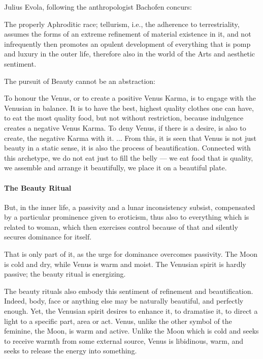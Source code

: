 Julius Evola, following the anthropologist Bachofen concurs:

\begin{quotex}
The properly Aphroditic race; tellurism, i.e., the adherence to terrestriality, assumes the forms of an extreme refinement of material existence in it, and not infrequently then promotes an opulent development of everything that is pomp and luxury in the outer life, therefore also in the world of the Arts and aesthetic sentiment.
\end{quotex}


The pursuit of Beauty cannot be an abstraction:

\begin{quotex}
To honour the Venus, or to create a positive Venus Karma, is to engage with the Venusian in balance. It is to have the best, highest quality clothes one can have, to eat the most quality food, but not without restriction, because indulgence creates a negative Venus Karma. To deny Venus, if there is a desire, is also to create, the negative Karma with it. ... From this, it is seen that Venus is not just beauty in a static sense, it is also the process of beautification. Connected with this archetype, we do not eat just to fill the belly --- we eat food that is quality, we assemble and arrange it beautifully, we place it on a beautiful plate.
\end{quotex}


\paragraph{The Beauty Ritual}


\begin{quotex}
But, in the inner life, a passivity and a lunar inconsistency subsist, compensated by a particular prominence given to eroticism, thus also to everything which is related to woman, which then exercises control because of that and silently secures dominance for itself.
\end{quotex}


That is only part of it, as the urge for dominance overcomes passivity. The Moon is cold and dry, while Venus is warm and moist. The Venusian spirit is hardly passive; the beauty ritual is energizing.

\begin{quotex}
The beauty rituals also embody this sentiment of refinement and beautification. Indeed, body, face or anything else may be naturally beautiful, and perfectly enough. Yet, the Venusian spirit desires to enhance it, to dramatise it, to direct a light to a specific part, area or act. Venus, unlike the other symbol of the feminine, the Moon, is warm and active. Unlike the Moon which is cold and seeks to receive warmth from some external source, Venus is libidinous, warm, and seeks to release the energy into something.
\end{quotex}


